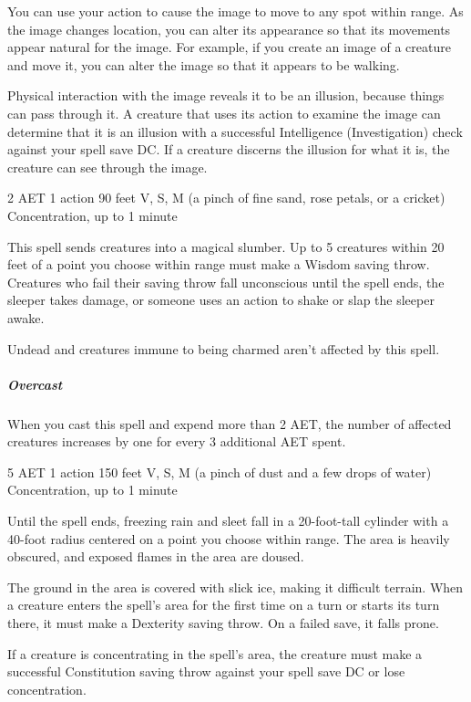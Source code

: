 You can use your action to cause the image to move to any spot within range. As the image changes location, you can alter its appearance so that its movements appear natural for the image. For example, if you create an image of a creature and move it, you can alter the image so that it appears to be walking.

Physical interaction with the image reveals it to be an illusion, because things can pass through it. A creature that uses its action to examine the image can determine that it is an illusion with a successful Intelligence (Investigation) check against your spell save DC. If a creature discerns the illusion for what it is, the creature can see through the image.


{2 AET}
{1 action}
{90 feet}
{V, S, M (a pinch of fine sand, rose petals, or a cricket)}
{Concentration, up to 1 minute}

This spell sends creatures into a magical slumber. Up to 5 creatures within 20 feet of a point you choose within range must make a Wisdom saving throw. Creatures who fail their saving throw fall unconscious until the spell ends, the sleeper takes damage, or someone uses an action to shake or slap the sleeper awake.

Undead and creatures immune to being charmed aren't affected by this spell.

\subparagraph*{Overcast} When you cast this spell and expend more than 2 AET, the number of affected creatures increases by one for every 3 additional AET spent.


{5 AET}
{1 action}
{150 feet}
{V, S, M (a pinch of dust and a few drops of water)}
{Concentration, up to 1 minute}

Until the spell ends, freezing rain and sleet fall in a 20-foot-tall cylinder with a 40-foot radius centered on a point you choose within range. The area is heavily obscured, and exposed flames in the area are doused.

The ground in the area is covered with slick ice, making it difficult terrain. When a creature enters the spell's area for the first time on a turn or starts its turn there, it must make a Dexterity saving throw. On a failed save, it falls prone.

If a creature is concentrating in the spell's area, the creature must make a successful Constitution saving throw against your spell save DC or lose concentration.


